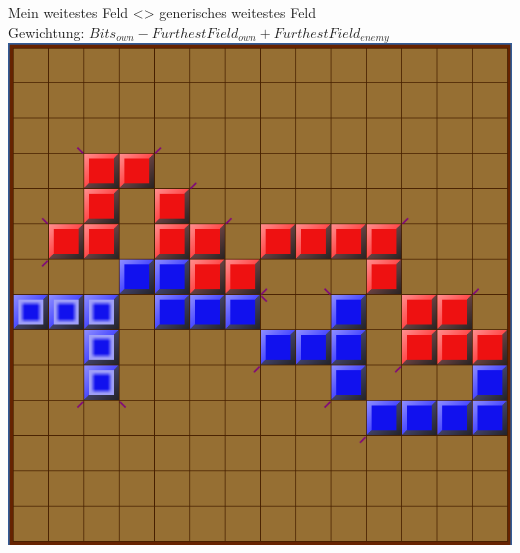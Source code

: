 \documentclass[12pt]{beamer}
\begin{document}
\begin{frame}
	Mein weitestes Feld <> generisches weitestes Feld\\
	Gewichtung: $Bits_{own} - FurthestField_{own} + FurthestField_{enemy}$\\
	\includegraphics[width=0.6\linewidth]{media/wgh14.png}
\end{frame}
\end{document}
